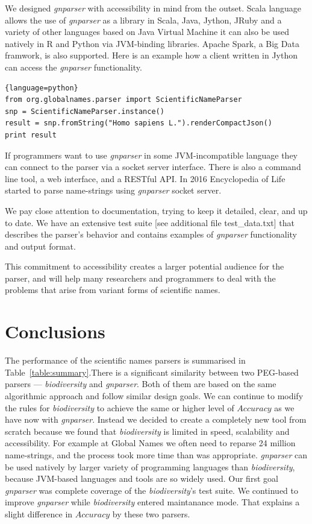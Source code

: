 \documentclass{bmcart}
\begin{document}
We designed \textit{gnparser} with accessibility in mind from the outset. Scala language allows the use of \textit{gnparser} as a library in Scala, Java, Jython, JRuby and a variety of other languages based on Java Virtual Machine it can also be used natively in R and Python via JVM-binding libraries. Apache Spark, a Big Data framwork, is also supported.  Here is an example how a client written in Jython can access the \textit{gnparser} functionality.

\begin{lstlisting}{language=python}
from org.globalnames.parser import ScientificNameParser
snp = ScientificNameParser.instance()
result = snp.fromString("Homo sapiens L.").renderCompactJson()
print result
\end{lstlisting}


If programmers want to use \textit{gnparser} in some JVM-incompatible language they can connect to the parser via a socket server interface. There is also a command line tool, a web interface, and a RESTful API\@. In 2016 Encyclopedia of Life started to parse name-strings using \textit{gnparser} socket server.


We pay close attention to documentation, trying to keep it detailed, clear, and up to date. We have an extensive test suite [see additional file test\_data.txt] that describes the parser's behavior and contains examples of \textit{gnparser} functionality and output format.

This commitment to accessibility creates a larger potential audience for the parser, and will help many researchers and programmers to deal with the problems that arise from variant forms of scientific names.

\section*{Conclusions}

The performance of the scientific names parsers is summarised  in Table~\ref{table:summary}.There is a significant similarity between two PEG-based parsers --- \textit{biodiversity} and \textit{gnparser}. Both of them are based on the same algorithmic approach and follow similar design goals. We can continue to modify the rules for \textit{biodiversity} to achieve the same or higher level of $Accuracy$ as we have now with \textit{gnparser}. Instead we decided to create a completely new tool from scratch because we found that \textit{biodiversity} is limited in speed, scalability and accessibility. For example at Global Names we often need to reparse 24 million name-strings, and the process took more time than was appropriate.  \textit{gnparser} can be used natively by larger variety of programming languages than \textit{biodiversity}, because JVM-based languages and tools are so widely used. Our first goal \textit{gnparser} was complete coverage of the \textit{biodiversity}'s test suite. We continued to improve \textit{gnparser} while \textit{biodiversity} entered maintanance mode. That explains a slight difference in $Accuracy$ by these two parsers.
\end{document}
